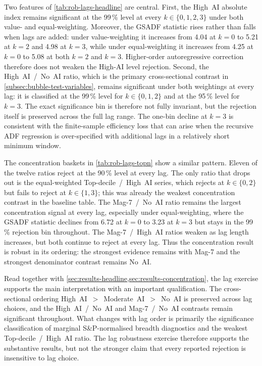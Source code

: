 Two features of \cref{tab:rob-lags-headline} are central. First, the High~AI absolute index remains significant at the 99\,\% level at every $k\in\{0,1,2,3\}$ under both value- and equal-weighting. Moreover, the GSADF statistic rises rather than falls when lags are added: under value-weighting it increases from 4.04 at $k=0$ to 5.21 at $k=2$ and 4.98 at $k=3$, while under equal-weighting it increases from 4.25 at $k=0$ to 5.08 at both $k=2$ and $k=3$. Higher-order autoregressive correction therefore does not weaken the High-AI level rejection. Second, the High~AI~/~No~AI ratio, which is the primary cross-sectional contrast in \cref{subsec:bubble-test-variables}, remains significant under both weightings at every lag: it is classified at the 99\,\% level for $k\in\{0,1,2\}$ and at the 95\,\% level for $k=3$. The exact significance bin is therefore not fully invariant, but the rejection itself is preserved across the full lag range. The one-bin decline at $k=3$ is consistent with the finite-sample efficiency loss that can arise when the recursive ADF regression is over-specified with additional lags in a relatively short minimum window.

The concentration baskets in \cref{tab:rob-lags-topn} show a similar pattern. Eleven of the twelve ratios reject at the 90\,\% level at every lag. The only ratio that drops out is the equal-weighted Top-decile~/~High~AI series, which rejects at $k\in\{0,2\}$ but fails to reject at $k\in\{1,3\}$; this was already the weakest concentration contrast in the baseline table. The Mag-7~/~No~AI ratio remains the largest concentration signal at every lag, especially under equal-weighting, where the GSADF statistic declines from 6.72 at $k=0$ to 3.23 at $k=3$ but stays in the 99\,\% rejection bin throughout. The Mag-7~/~High~AI ratios weaken as lag length increases, but both continue to reject at every lag. Thus the concentration result is robust in its ordering: the strongest evidence remains with Mag-7 and the strongest denominator contrast remains No~AI.

Read together with \cref{sec:results-headline,sec:results-concentration}, the lag exercise supports the main interpretation with an important qualification. The cross-sectional ordering High~AI~$>$~Moderate~AI~$>$~No~AI is preserved across lag choices, and the High~AI~/~No~AI and Mag-7~/~No~AI contrasts remain significant throughout. What changes with lag order is primarily the significance classification of marginal S\&P-normalised breadth diagnostics and the weakest Top-decile~/~High~AI ratio. The lag robustness exercise therefore supports the substantive results, but not the stronger claim that every reported rejection is insensitive to lag choice.

